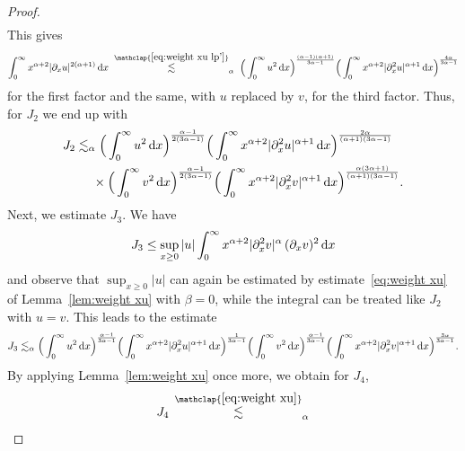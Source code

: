 \documentclass[reqno,12pt]{amsart}
\renewcommand{\d}{\ensuremath{\mathrm{d}}}
\renewcommand{\d}{\ensuremath{{\rm d}}}
\numberwithin{equation}{section}
\begin{document}
\begin{proof}
\begin{align*}
\end{align*}
%
This gives
%
\begin{equation*}
    \int_0^\infty x^{\alpha+2} |\partial_x u|^{2(\alpha+1)}\, \d x
    \; \stackrel{\mathclap{\eqref{eq:weight xu lp'}}}{\lesssim}_\alpha \;
    \Big(\int_0^\infty u^2\, \d x\Big)^\frac{(\alpha-1)(\alpha+1)}{3\alpha-1}
    \Big(
    \int_0^\infty x^{\alpha+2} |\partial_x^2 u|^{\alpha+1}\, \d x
    \Big)^\frac{4\alpha}{3\alpha-1}
\end{equation*}
%
for the first factor and the same, with $u$ replaced by $v$, for the third factor. Thus, for $J_2$ we end up with
\begin{align}\nonumber
    J_2
    & \lesssim_\alpha
    \Big(\int_0^\infty
    u^2\, \d x
    \Big)^\frac{\alpha-1}{2(3\alpha-1)}
    \Big(\int_0^\infty
    x^{\alpha+2} |\partial_x^2 u|^{\alpha+1}\, \d x
    \Big)^\frac{2\alpha}{(\alpha+1)(3\alpha-1)} \\
    & \phantom{\lesssim_\alpha} \times \Big(\int_0^\infty
    v^2\, \d x
    \Big)^\frac{\alpha-1}{2(3\alpha-1)} 
    \Big(\int_0^\infty
    x^{\alpha+2} |\partial_x^2 v|^{\alpha+1}\, \d x
    \Big)^\frac{\alpha(3\alpha+1)}{(\alpha+1)(3\alpha-1)}. \label{eq:N(v)u_J2}
\end{align}
%
Next, we estimate $J_3$. We have
%
\begin{equation*}
\begin{split}
    J_3
    \leq
    \sup_{x \geq 0} |u| 
    \int_0^\infty x^{\alpha+2} |\partial_x^2 v|^\alpha\, (\partial_x v)^2\, \d x
\end{split}
\end{equation*}
%
and observe that $\sup_{x \geq 0} |u|$ can again be estimated by estimate~\eqref{eq:weight xu} of Lemma~\ref{lem:weight xu} with $\beta=0$, while the integral can be treated like $J_2$ with $u=v$. This leads to the estimate
%
\begin{equation}\label{eq:N(v)u_J3}
    J_3
    \lesssim_\alpha
    \Big(\int_0^\infty u^2\, \d x\Big)^\frac{\alpha-1}{3\alpha-1}
    \Big(\int_0^\infty x^{\alpha+2} |\partial_x^2 u|^{\alpha+1} \, \d x\Big)^\frac{1}{3\alpha-1}
    \Big(\int_0^\infty
    v^2\, \d x
    \Big)^\frac{\alpha-1}{3\alpha-1} 
    \Big(\int_0^\infty
    x^{\alpha+2} |\partial_x^2 v|^{\alpha+1}\, \d x
    \Big)^\frac{3\alpha}{3\alpha-1}.
\end{equation}
%
By applying Lemma~\ref{lem:weight xu} once more, we obtain for $J_4$,
%
\begin{equation} \label{eq:N(v)u_J4}
    J_4 
    \, \stackrel{\mathclap{\eqref{eq:weight xu}}}{\lesssim}_\alpha 

\end{equation}
\end{proof}
\end{document}
